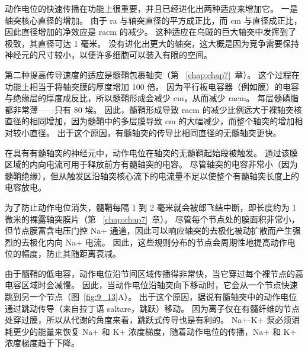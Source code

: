 动作电位的快速传播在功能上很重要，并且已经进化出两种适应来增加它。
一是轴突核心直径的增加。
由于 ra 与轴突直径的平方成正比，而 cm 与直径成正比，因此直径增加的净效应是 racm 的减少。
这种适应在乌贼的巨大轴突中发挥到了极致，其直径可达 1 毫米。
没有进化出更大的轴突，这大概是因为竞争需要保持神经元的尺寸较小，以便许多细胞可以装入有限的空间。


第二种提高传导速度的适应是髓鞘包裹轴突（第 ~\ref{chap:chap7}~章）。 
这个过程在功能上相当于将轴突膜的厚度增加 100 倍。 
因为平行板电容器（例如膜）的电容与绝缘层的厚度成反比，所以髓鞘形成会减少 cm，从而减少 racm。
每层髓磷脂都非常薄——只有 80 埃。
因此，髓鞘形成导致 racm 的减少比例远大于裸轴突核直径的相同增加，因为髓鞘中的多层膜导致 cm 的大幅减少，而整个轴突的增加相对较小直径。
出于这个原因，有髓轴突的传导比相同直径的无髓轴突更快。


在具有有髓轴突的神经元中，动作电位在轴突的无髓鞘起始段被触发。
通过该膜区域的内向电流可用于释放前方有髓轴突的电容。
尽管轴突的电容非常小（因为髓鞘绝缘），但从触发区沿轴突核心流下的电流量不足以使整个有髓轴突长度上的电容放电。


为了防止动作电位消失，髓鞘每隔 1 到 2 毫米就会被郎飞结中断，即长度约为 1 微米的裸露轴突膜片（第 ~\ref{chap:chap7}~章）。 
尽管每个节点处的膜面积非常小，但节点膜富含电压门控 Na+ 通道，因此可以响应轴突的去极化被动扩散而产生强烈的去极化内向 Na+ 电流。
因此，这些规则分布的节点会周期性地提高动作电位的幅度，防止其随距离衰减。


由于髓鞘的低电容，动作电位沿节间区域传播得非常快，当它穿过每个裸节点的高电容区域时会减慢。
因此，当动作电位沿轴突向下移动时，它会从一个节点快速跳到另一个节点（图~\ref{fig:9_13}A）。 
出于这个原因，据说有髓轴突中的动作电位通过跳动传导（来自拉丁语 saltare，跳跃）移动。
因为离子仅在有髓纤维的节点处穿过膜，所以从代谢的角度来看，跳跃式传导也是有利的。
Na+-K+ 泵必须消耗更少的能量来恢复 Na+ 和 K+ 浓度梯度，随着动作电位的传播，Na+ 和 K+ 浓度梯度趋于下降。


